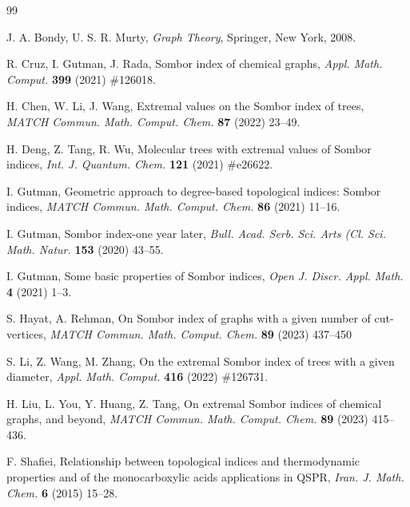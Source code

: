 \documentclass[a4paper,12pt]{article}
\begin{document}
\begin{thebibliography}{99}

 J. A. Bondy, U. S. R. Murty, {\it Graph Theory\/}, Springer, New York, 2008.

 R. Cruz, I. Gutman, J. Rada, Sombor index of chemical graphs,
        {\it Appl. Math. Comput.\/} {\bf 399} (2021) \#126018.

 H. Chen, W. Li, J. Wang, Extremal values on the Sombor index of trees,
        {\it MATCH Commun. Math. Comput. Chem.\/} {\bf 87} (2022) 23--49.

 H. Deng, Z. Tang, R. Wu, Molecular trees with extremal values of Sombor indices,
        {\it Int. J. Quantum. Chem.\/} {\bf 121} (2021) \#e26622.

 I. Gutman, Geometric approach to degree-based topological indices: Sombor indices,
        {\it MATCH Commun. Math. Comput. Chem.\/} {\bf 86} (2021) 11--16.

 I. Gutman, Sombor index-one year later,
        {\it Bull. Acad. Serb. Sci. Arts (Cl. Sci. Math. Natur.\/} {\bf 153} (2020) 43--55.

 I. Gutman, Some basic properties of Sombor indices,
        {\it Open J. Discr. Appl. Math.\/} {\bf 4} (2021) 1--3.

 S. Hayat, A. Rehman, On Sombor index of graphs with a given number of cut-vertices,
        {\it MATCH Commun. Math. Comput. Chem.\/} {\bf 89} (2023) 437--450

 S. Li, Z. Wang, M. Zhang, On the extremal Sombor index of trees with a given diameter,
        {\it Appl. Math. Comput.\/} {\bf 416} (2022) \#126731.

 H. Liu, L. You, Y. Huang, Z. Tang, On extremal Sombor indices of chemical graphs, and beyond,
        {\it MATCH Commun. Math. Comput. Chem.\/} {\bf 89} (2023) 415--436.

 F. Shafiei, Relationship between topological indices and thermodynamic properties and of the monocarboxylic acids applications in QSPR,
        {\it Iran. J. Math. Chem.\/} {\bf 6} (2015) 15--28.











\end{thebibliography}
\end{document}
